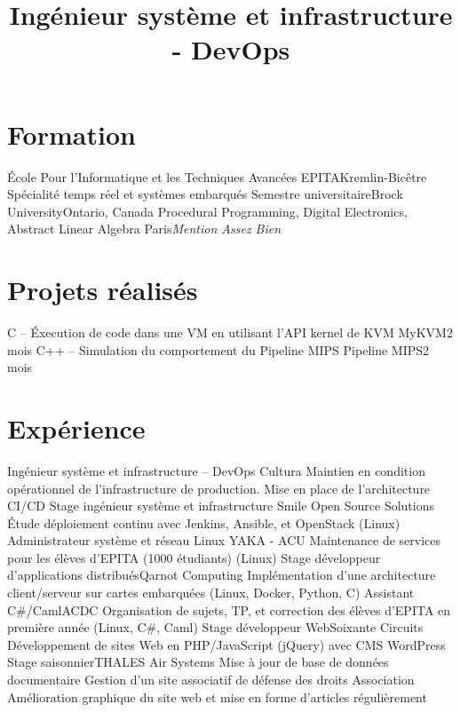 \documentclass[10pt,a4paper,sans]{moderncv}
\title{Ingénieur système et infrastructure - DevOps}
\begin{document}
\makecvtitle

\vspace{-3\baselineskip}

\section{Formation}
    {École Pour l'Informatique et les Techniques Avancées}
    {EPITA}{Kremlin-Bicêtre}{}
    {Spécialité temps réel et systèmes embarqués}
    {Semestre universitaire}{Brock University}{Ontario, Canada}{}
    {Procedural Programming, Digital Electronics, Abstract Linear Algebra}
    {Paris}{\textit{Mention Assez Bien}}{}

\section{Projets réalisés}
    {C -- Éxecution de code dans une VM en utilisant l'API kernel de KVM}
    {MyKVM}{2 mois}{}{}
    {C++ -- Simulation du comportement du Pipeline MIPS}
    {Pipeline MIPS}{2 mois}{}{}

\section{Expérience}
    {Ingénieur système et infrastructure -- DevOps}
    {Cultura}{}{}
    {Maintien en condition opérationnel de l'infrastructure de production. Mise en place de l'architecture CI/CD}
    {Stage ingénieur système et infrastructure}
    {Smile Open Source Solutions}{}{}
    {Étude déploiement continu avec Jenkins, Ansible, et OpenStack (Linux)}
    {Administrateur système et réseau Linux}
    {YAKA - ACU}{}{}
    {Maintenance de services pour les élèves d'EPITA (1000 étudiants) (Linux)}
    {Stage développeur d'applications distribués}{Qarnot Computing}{}{}
    {Implémentation d'une architecture client/serveur sur cartes embarquées (Linux, Docker, Python, C)}
    {Assistant C\#/Caml}{ACDC}{}{}
    {Organisation de sujets, TP, et correction des élèves d'EPITA en première année (Linux, C\#, Caml)}
    {Stage développeur Web}{Soixante Circuits}{}{}
    {Développement de sites Web en PHP/JavaScript (jQuery) avec CMS WordPress}
    {Stage saisonnier}{THALES Air Systems}{}{}
    {Mise à jour de base de données documentaire}
    {Gestion d'un site associatif de défense des droits}
    {Association}{}{}
    {Amélioration graphique du site web et mise en forme d'articles régulièrement}
\end{document}
